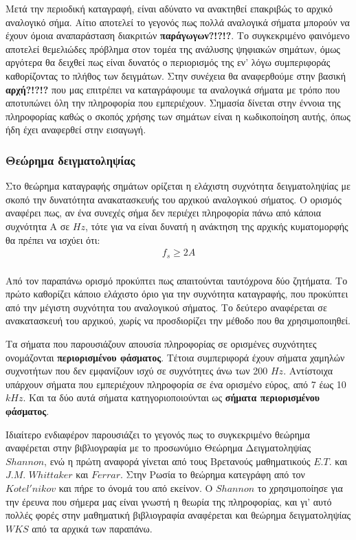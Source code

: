 \documentclass[breaklines=true, 12pt]{article}
\begin{document}
Μετά την περιοδική καταγραφή, είναι αδύνατο να ανακτηθεί επακριβώς το αρχικό
αναλογικό σήμα. Αίτιο αποτελεί το γεγονός πως πολλά αναλογικά σήματα μπορούν
να έχουν όμοια αναπαράσταση διακριτών \textbf{παράγωγων?!?!?}. Το συγκεκριμένο
φαινόμενο αποτελεί θεμελιώδες πρόβλημα στον τομέα της ανάλυσης ψηφιακών
σημάτων, όμως αργότερα θα δειχθεί πως είναι δυνατός ο περιορισμός της εν' λόγω
συμπεριφοράς καθορίζοντας το πλήθος των δειγμάτων. Στην συνέχεια θα αναφερθούμε
στην βασική \textbf{αρχή?!?!?} που μας επιτρέπει να καταγράφουμε τα αναλογικά σήματα με
τρόπο που αποτυπώνει όλη την πληροφορία που εμπεριέχουν. Σημασία δίνεται στην
έννοια της πληροφορίας καθώς ο σκοπός χρήσης των σημάτων είναι η κωδικοποίηση
αυτής, όπως ήδη έχει αναφερθεί στην εισαγωγή.
\subsubsection{Θεώρημα δειγματοληψίας}
\label{sec:org932f9b6}
Στο θεώρημα καταγραφής σημάτων ορίζεται η ελάχιστη συχνότητα δειγματοληψίας με
σκοπό την δυνατότητα ανακατασκευής του αρχικού αναλογικού σήματος. Ο ορισμός αναφέρει
πως, αν ένα συνεχές σήμα δεν περιέχει πληροφορία πάνω από κάποια συχνότητα Α σε
\(Hz\), τότε για να είναι δυνατή η ανάκτηση της αρχικής κυματομορφής θα πρέπει να
ισχύει ότι:
\begin{equation}
\begin{align}
f_{s} \geq 2A \\
\end{align}
\end{equation}

Από τον παραπάνω ορισμό προκύπτει πως απαιτούνται ταυτόχρονα δύο ζητήματα. Το
πρώτο καθορίζει κάποιο ελάχιστο όριο για την συχνότητα καταγραφής, που προκύπτει
από την μέγιστη συχνότητα του αναλογικού σήματος. Το δεύτερο αναφέρεται σε
ανακατασκευή του αρχικού, χωρίς να προσδιορίζει την μέθοδο που θα χρησιμοποιηθεί.

Τα σήματα που παρουσιάζουν απουσία πληροφορίας σε ορισμένες συχνότητες ονομάζονται
\textbf{περιορισμένου φάσματος}. Τέτοια συμπεριφορά έχουν σήματα χαμηλών συχνοτήτων που δεν
εμφανίζουν ισχύ σε συχνότητες άνω των 200 \(Hz\). Αντίστοιχα υπάρχουν σήματα που
εμπεριέχουν πληροφορία σε ένα ορισμένο εύρος, από 7 έως 10 \(kHz\). Και τα δύο αυτά
σήματα κατηγοριοποιούνται ως \textbf{σήματα περιορισμένου φάσματος}.

Ιδιαίτερο ενδιαφέρον παρουσιάζει το γεγονός πως το συγκεκριμένο θεώρημα αναφέρεται
στην βιβλιογραφία με το προσωνύμιο Θεώρημα Δειγματοληψίας \(Shannon\), ενώ
η πρώτη αναφορά γίνεται από τους Βρετανούς μαθηματικούς \(E.T.\) και \(J.M.\)
\(Whittaker\) και \(Ferrar\). Στην Ρωσία το θεώρημα κατεγράφη από τον
\(Kotel'nikov\) και πήρε το όνομά του από εκείνον. Ο \(Shannon\)
το χρησιμοποίησε για την έρευνα που σήμερα μας είναι γνωστή η θεωρία της
πληροφορίας, και γι' αυτό πολλές φορές στην μαθηματική βιβλιογραφία
αναφέρεται και θεώρημα δειγματοληψίας \(WKS\) από τα αρχικά των παραπάνω.
\end{document}

